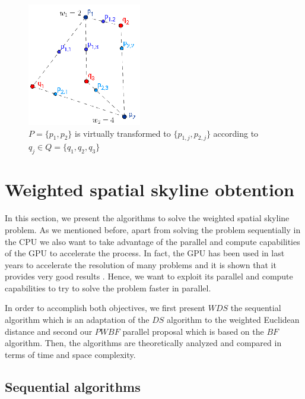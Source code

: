 \documentclass[11pt,onecolumn]{elsart3p}
\begin{document}
        \begin{figure}[]
        \begin{center}
        \includegraphics[width=0.3\linewidth]{img/P3_q2.eps}
        \caption{ $P=\{p_1,p_2\}$ is virtually transformed to $\{p_{1,j}, p_{2,j}\}$ according to $q_j\in Q = \{q_1, q_2, q_3\}$}\label{fig:virtual_location}
        \end{center}
        \end{figure}




\section{Weighted spatial skyline obtention} \label{sec:Algorithms}

    In this section, we present the algorithms to solve the weighted spatial skyline problem. As we mentioned before, apart from solving the problem sequentially in the CPU we also want to take advantage of the parallel and compute capabilities of the GPU to accelerate the process. In fact, the GPU has been used in last years to accelerate the resolution of many problems and it is shown that it provides very good results \cite{FS13,FS14a,FS15,FS16, FS16b,XW18,XZCMW18}. Hence, we want to exploit its parallel and compute capabilities to try to solve the problem faster in parallel.

    In order to accomplish both objectives, we first present $WDS$ the sequential algorithm which is an adaptation of the $DS$ algorithm to the weighted Euclidean distance and second our $PWBF$ parallel proposal which is based on the $BF$ algorithm. Then, the algorithms are theoretically analyzed and compared in terms of time and space complexity.

    \subsection{Sequential algorithms} \label{sec:seq_alg}
\end{document}
